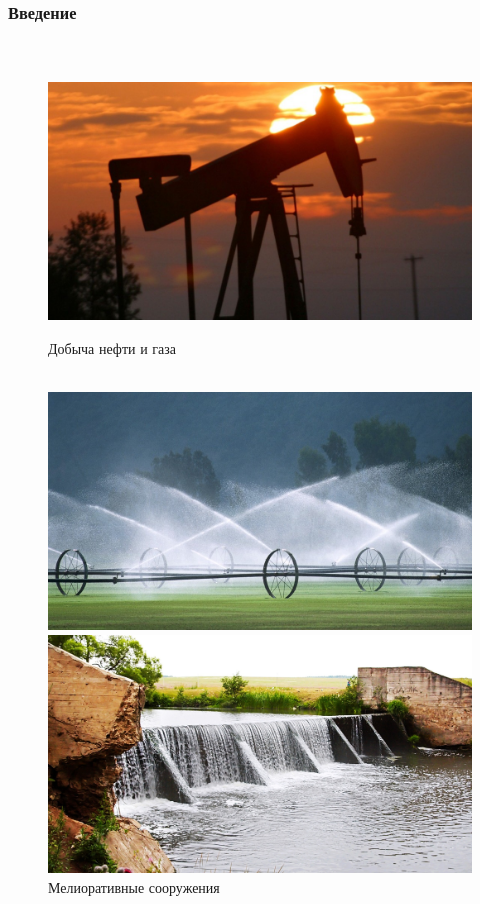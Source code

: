 \documentclass[10pt,pdf,hyperref={unicode}]{beamer} %
\begin{document}
\begin{frame}
\begin{center}
\frametitle{Введение}
\framesubtitle{\ }
\begin{figure}
\begin{minipage}[h]{0.43\textwidth}
\includegraphics[width=1.0\textwidth]{oil_pump169.jpg}
\caption{\small{Добыча нефти и газа\\ \ }}
\end{minipage}
\hspace{8mm}
\begin{minipage}[h]{0.43\textwidth}
\includegraphics[width=1.0\textwidth]{melio169.jpg}
\caption{\small{Мелиоративные сооружения\\ \ }}
\end{minipage}
\vfill
\begin{minipage}[h]{0.43\textwidth}
\includegraphics[width=1.0\textwidth]{plotina169.jpg}

\end{minipage}
\end{figure}
\end{center}
\end{frame}
\end{document}
